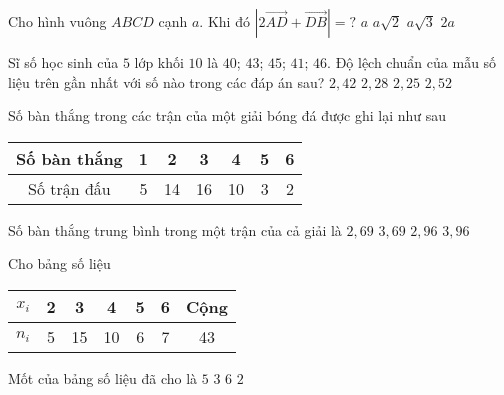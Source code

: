 \begin{ex}%
	Cho hình vuông $ABCD$ cạnh $a$. Khi đó $\left|2\overrightarrow{AD}+\overrightarrow{DB}\right|=?$
	\choice
	{$a$}
	{\True $a\sqrt{2}$}
	{$a\sqrt{3}$}
	{$2a$}
\end{ex}
\begin{ex}%
	Sĩ số học sinh của $5$ lớp khối $10$ là $40$; $43$; $45$; $41$; $46$. Độ lệch chuẩn của mẫu số liệu trên gần nhất với số nào trong các đáp án sau?
	\choice
	{$2{,}42$}
	{\True $2{,}28$}
	{$2{,}25$}
	{$2{,}52$}
\end{ex}
\begin{ex}%
	Số bàn thắng trong các trận của một giải bóng đá được ghi lại như sau
	\begin{center}
		\begin{tabular}{|c|c|c|c|c|c|c|}
			\hline
			Số bàn thắng & 1 & 2 & 3 & 4 & 5 & 6 \\
			\hline
			Số trận đấu & 5 & 14 & 16 & 10 & 3 & 2 \\
			\hline
		\end{tabular}
	\end{center}
	Số bàn thắng trung bình trong một trận của cả giải là
	\choice
	{$2{,}69$}
	{$3{,}69$}
	{\True $2{,}96$}
	{$3{,}96$}
\end{ex}
\begin{ex}%
	Cho bảng số liệu
	\begin{center}
		\begin{tabular}{|c|c|c|c|c|c|c|}
			\hline
			$x_i $ & 2 & 3 & 4 & 5 & 6 & Cộng \\
			\hline
			$n_i $ & 5 & 15 & 10 & 6 & 7 & 43 \\
			\hline
		\end{tabular}
	\end{center}
	Mốt của bảng số liệu đã cho là
	\choice
	{$5$}
	{\True $3$}
	{$6$}
	{$2$}
\end{ex}
